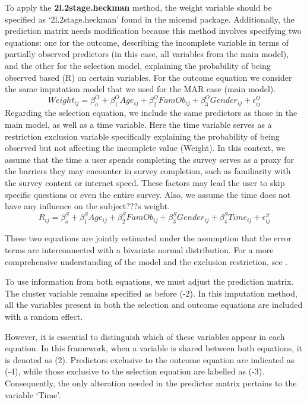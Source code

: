 \documentclass[
  article]{jss}
\begin{document}
To apply the \textbf{2l.2stage.heckman} method, the weight variable
should be specified as `2l.2stage.heckman' found in the micemd package.
Additionally, the prediction matrix needs modification because this
method involves specifying two equations: one for the outcome,
describing the incomplete variable in terms of partially observed
predictors (in this case, all variables from the main model), and the
other for the selection model, explaining the probability of being
observed based (R) on certain variables. For the outcome equation we
consider the same imputation model that we used for the MAR case (main
model).
\[Weight_{ij}= \beta^O_{o} + \beta^O_{1}Age_{ij} + \beta^O_{2}FamOb_{ij}+ \beta^O_{3}Gender_{ij} + \epsilon^O_{ij}\]
Regarding the selection equation, we include the same predictors as
those in the main model, as well as a time variable. Here the time
variable serves as a restriction exclusion variable specifically
explaining the probability of being observed but not affecting the
incomplete value (Weight). In this context, we assume that the time a
user spends completing the survey serves as a proxy for the barriers
they may encounter in survey completion, such as familiarity with the
survey content or internet speed. These factors may lead the user to
skip specific questions or even the entire survey. Also, we assume the
time does not have any influence on the subject???s weight.
\[R_{ij}= \beta^S_{o} + \beta^S_{1}Age_{ij} + \beta^S_{2}FamOb_{ij}+ \beta^S_{3}Gender_{ij} +\beta^S_{4}Time_{ij}+ \epsilon^S_{ij}\]

These two equations are jointly estimated under the assumption that the
error terms are interconnected with a bivariate normal distribution. For
a more comprehensive understanding of the model and the exclusion
restriction, see \cite{munoz2023a}.

To use information from both equations, we must adjust the prediction
matrix. The cluster variable remains specified as before (-2). In this
imputation method, all the variables present in both the selection and
outcome equations are included with a random effect.

However, it is essential to distinguish which of these variables appear
in each equation. In this framework, when a variable is shared between
both equations, it is denoted as (2). Predictors exclusive to the
outcome equation are indicated as (-4), while those exclusive to the
selection equation are labelled as (-3). Consequently, the only
alteration needed in the predictor matrix pertains to the variable
`Time'.
\end{document}
